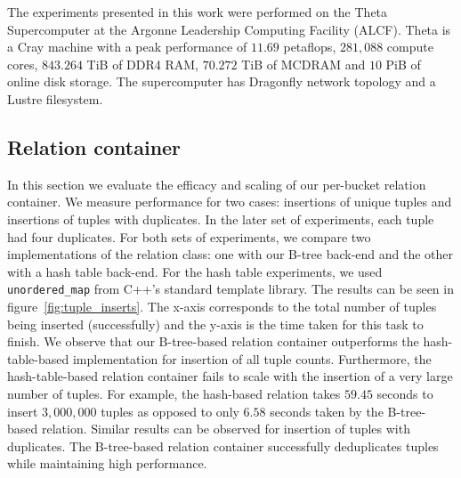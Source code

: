 
The experiments presented in this work were performed on
the Theta Supercomputer at the Argonne Leadership Computing Facility
(ALCF). Theta is a Cray machine with a peak
performance of $11.69$ petaflops, $281,\!088$ compute cores, $843.264$
TiB of DDR4 RAM, $70.272$ TiB of MCDRAM and $10$ PiB of online disk storage. 
The supercomputer has Dragonfly network topology and a Lustre filesystem.



\subsection{Relation container}
\label{sec:relation}

In this section we evaluate the efficacy and scaling of our per-bucket relation container. We measure performance for two cases: insertions of unique tuples and insertions of tuples with duplicates. In the later set of experiments, each tuple had four duplicates. For both sets of experiments, we compare two implementations of the relation class: one with our B-tree back-end and the other with a hash table back-end. For the hash table experiments, we used \texttt{unordered\_map} from C++'s standard template library. The results can be seen in figure~\ref{fig:tuple_inserts}. The x-axis corresponds to the total number of tuples being inserted (successfully) and the y-axis is the time taken for this task to finish. We observe that our B-tree-based relation container outperforms the hash-table-based implementation for insertion of all tuple counts. Furthermore, the hash-table-based relation container fails to scale with the insertion of a very large number of tuples. For example, the hash-based relation takes $59.45$ seconds to insert $3,\!000,\!000$ tuples as opposed to only $6.58$ seconds taken by the B-tree-based relation. Similar results can be observed for insertion of tuples with duplicates. The B-tree-based relation container successfully deduplicates tuples while maintaining high performance.


